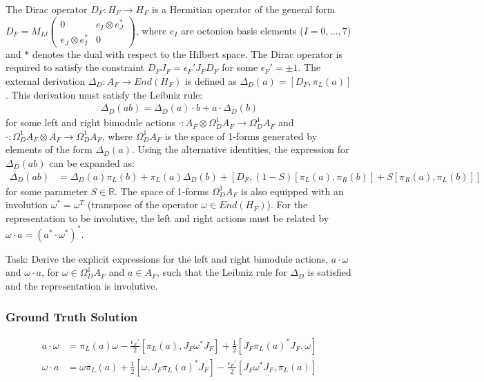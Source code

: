 \documentclass[10pt]{article}
\begin{document}
The Dirac operator $D_F: H_F \rightarrow H_F$ is a Hermitian operator of the general form $D_F = M_{IJ}\begin{pmatrix} 0 & e_I\otimes e_J^\ast \\ e_J\otimes e_I^\ast & 0 \end{pmatrix}$, where $e_I$ are octonion basis elements ($I=0,...,7$) and $\ast$ denotes the dual with respect to the Hilbert space. The Dirac operator is required to satisfy the constraint $D_F J_F = \epsilon_F' J_F D_F$ for some $\epsilon_F' = \pm 1$. The external derivation $\Delta_D: A_F \rightarrow End(H_F)$ is defined as $\Delta_D(a) = [D_F, \pi_L(a)]$. This derivation must satisfy the Leibniz rule:
\begin{align*}
\Delta_D(ab) = \Delta_D(a)\cdot b + a\cdot\Delta_D(b)
\end{align*}
for some left and right bimodule actions $\cdot: A_F \otimes \Omega_D^1 A_F \rightarrow \Omega_D^1 A_F$ and $\cdot: \Omega_D^1 A_F \otimes A_F \rightarrow \Omega_D^1 A_F$, where $\Omega_D^1 A_F$ is the space of 1-forms generated by elements of the form $\Delta_D(a)$. Using the alternative identities, the expression for $\Delta_D(ab)$ can be expanded as:
\begin{align*}
\Delta_D(ab) &= \Delta_D(a)\pi_L(b) + \pi_L(a)\Delta_D(b) + [D_F,(1-S)[\pi_L(a),\pi_R(b)] +S[\pi_R(a),\pi_L(b)]]
\end{align*}
for some parameter $S \in \mathbb{R}$. The space of 1-forms $\Omega_D^1 A_F$ is also equipped with an involution $\omega^* = \omega^T$ (transpose of the operator $\omega \in End(H_F)$). For the representation to be involutive, the left and right actions must be related by $\omega \cdot a = (a^* \cdot \omega^*)^*$.

Task:
Derive the explicit expressions for the left and right bimodule actions, $a \cdot \omega$ and $\omega \cdot a$, for $\omega \in \Omega_D^1 A_F$ and $a \in A_F$, such that the Leibniz rule for $\Delta_D$ is satisfied and the representation is involutive.

\subsubsection*{Ground Truth Solution}
\[ \boxed{\begin{align*}
a\cdot \omega &= \pi_L(a)\omega -\frac{\epsilon_F'}{2}[\pi_L(a),J_F\omega^* J_F] +\frac{1}{2}[J_F\pi_L(a)^*J_F,\omega] \\
\omega\cdot a &= \omega\pi_L(a) +\frac{1}{2}[\omega,J_F\pi_L(a)^*J_F] -\frac{\epsilon_F'}{2}[J_F\omega^*J_F,\pi_L(a)]
\end{align*}} \]
\end{document}
